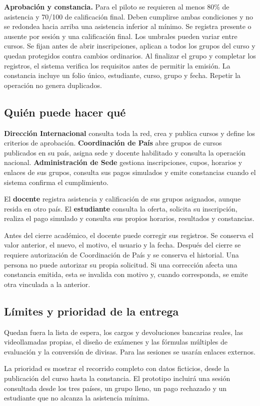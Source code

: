 \documentclass[11pt,letterpaper]{article}
\newcommand{\apartado}[1]{\subsection*{\textcolor{azul}{#1}}}
\begin{document}
\textbf{Aprobación y constancia.} Para el piloto se requieren al menos 80\% de asistencia y 70/100 de calificación final. Deben cumplirse ambas condiciones y no se redondea hacia arriba una asistencia inferior al mínimo. Se registra presente o ausente por sesión y una calificación final. Los umbrales pueden variar entre cursos. Se fijan antes de abrir inscripciones, aplican a todos los grupos del curso y quedan protegidos contra cambios ordinarios. Al finalizar el grupo y completar los registros, el sistema verifica los requisitos antes de permitir la emisión. La constancia incluye un folio único, estudiante, curso, grupo y fecha. Repetir la operación no genera duplicados.

\newpage
\apartado{Quién puede hacer qué}
\textbf{Dirección Internacional} consulta toda la red, crea y publica cursos y define los criterios de aprobación. \textbf{Coordinación de País} abre grupos de cursos publicados en su país, asigna sede y docente habilitado y consulta la operación nacional. \textbf{Administración de Sede} gestiona inscripciones, cupos, horarios y enlaces de sus grupos, consulta sus pagos simulados y emite constancias cuando el sistema confirma el cumplimiento.

El \textbf{docente} registra asistencia y calificación de sus grupos asignados, aunque resida en otro país. El \textbf{estudiante} consulta la oferta, solicita su inscripción, realiza el pago simulado y consulta sus propios horarios, resultados y constancias.

Antes del cierre académico, el docente puede corregir sus registros. Se conserva el valor anterior, el nuevo, el motivo, el usuario y la fecha. Después del cierre se requiere autorización de Coordinación de País y se conserva el historial. Una persona no puede autorizar su propia solicitud. Si una corrección afecta una constancia emitida, esta se invalida con motivo y, cuando corresponda, se emite otra vinculada a la anterior.

\apartado{Límites y prioridad de la entrega}
Quedan fuera la lista de espera, los cargos y devoluciones bancarias reales, las videollamadas propias, el diseño de exámenes y las fórmulas múltiples de evaluación y la conversión de divisas. Para las sesiones se usarán enlaces externos.

La prioridad es mostrar el recorrido completo con datos ficticios, desde la publicación del curso hasta la constancia. El prototipo incluirá una sesión consultada desde los tres países, un grupo lleno, un pago rechazado y un estudiante que no alcanza la asistencia mínima.
\end{document}
